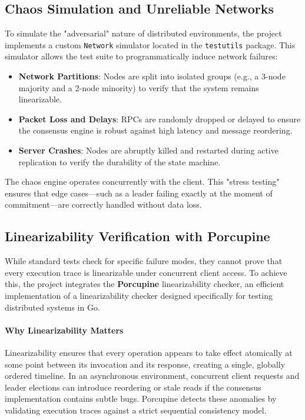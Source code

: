 \subsection{Chaos Simulation and Unreliable Networks}
To simulate the "adversarial" nature of distributed environments, the project implements a custom \texttt{Network} simulator located in the \texttt{testutils} package. This simulator allows the test suite to programmatically induce network failures:

\begin{itemize}
    \item \textbf{Network Partitions}: Nodes are split into isolated groups (e.g., a 3-node majority and a 2-node minority) to verify that the system remains linearizable.
    \item \textbf{Packet Loss and Delays}: RPCs are randomly dropped or delayed to ensure the consensus engine is robust against high latency and message reordering.
    \item \textbf{Server Crashes}: Nodes are abruptly killed and restarted during active replication to verify the durability of the state machine.
\end{itemize}

The chaos engine operates concurrently with the client. This "stress testing" ensures that edge cases—such as a leader failing exactly at the moment of commitment—are correctly handled without data loss.

\subsection{Linearizability Verification with Porcupine}
While standard tests check for specific failure modes, they cannot prove that every execution trace is linearizable under concurrent client access. To achieve this, the project integrates the \textbf{Porcupine} linearizability checker, an efficient implementation of a linearizability checker designed specifically for testing distributed systems in Go.

\paragraph{Why Linearizability Matters}
Linearizability ensures that every operation appears to take effect atomically at some point between its invocation and its response, creating a single, globally ordered timeline. In an asynchronous environment, concurrent client requests and leader elections can introduce reordering or stale reads if the consensus implementation contains subtle bugs. Porcupine detects these anomalies by validating execution traces against a strict sequential consistency model.

